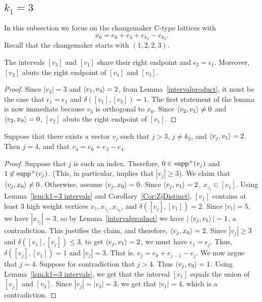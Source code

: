\subsection{{\boldmath $k_1=3$}}\label{k1=3}

In this subsection we focus on the changemaker C-type lattices with 
\begin{equation}\label{x0k1=3}
x_0=e_0+e_3+e_{k_2} - e_{k_3}.
\end{equation}  
Recall that the changemaker starts with $(1,2,2,3)$.

\begin{lemma}\label{lem:k1=3 intervals}
		The intervals $[v_3]$ and $[v_1]$ share their right endpoint and $\epsilon_3 = \epsilon_1$. Moreover, $[v_2]$ abuts the right endpoint of $[v_1]$ and $[v_3]$.
\end{lemma}
\begin{proof}
Since $|v_3|=3$ and $\left\langle v_1 , v_3 \right\rangle=2$, from Lemma~\ref{intervalproduct}, it must be the case that $\epsilon_1=\epsilon_3$ and $\delta([v_1], [v_3])=1$. The first statement of the lemma is now immediate because $v_3$ is orthogonal to $x_0$. Since $\left\langle v_2 , v_1 \right\rangle\ne0$ and $\left\langle v_2 , x_0 \right\rangle=0$, $[v_2]$ abuts the right endpoint of $[v_1]$.
\end{proof}


\begin{cor}\label{cor:k1=3 intervals}
		Suppose that there exists a vector $v_j$ such that $j>3$, $j\neq k_3$, and $\left\langle v_j , v_1 \right\rangle = 2$. Then $j=4$, and that $v_4 = e_0 + e_3-e_4$. 
\end{cor}

\begin{proof}
Suppose that $j$ is such an index. Therefore, $0\in \operatorname{supp}^+(v_j)$ and $1\not \in \operatorname{supp}^+(v_j)$. (This, in particular, implies that $|v_j|\ge3$). We claim that $\left\langle v_j , x_0 \right\rangle\neq 0$. Otherwise, assume $\left\langle v_j , x_0 \right\rangle= 0$. Since $\left\langle v_j , v_1 \right\rangle=2$, $x_{z_j}\in[v_1]$. Using Lemma~\ref{lem:k1=3 intervals} and Corollary~\ref{Cor:ZjDistinct}, $[v_1]$ contains at least $3$ high weight vertices $x_1,x_{z_j},x_{z_3}$, and $\delta([v_j],[v_1])=2$. Since $|v_1|=5$, we have $|x_{z_j}|=3$, so by Lemma~\ref{intervalproduct} we have $|\left\langle v_j , v_1 \right\rangle|=1$, a contradiction.
This justifies the claim, and therefore, $\left\langle v_j , x_0 \right\rangle=2$. Since $|v_j|\ge 3$ and $\delta([v_1], [v_j])\le 3$, to get $\left\langle v_j , v_1 \right\rangle=2$, we must have $\epsilon_1=\epsilon_j$. Thus, $\delta([v_j], [v_1])=1$ and $|v_j|=3$. That is, $v_j=e_0+e_{j-1}-e_{j}$. We now argue that $j=4$. Suppose for contradiction that $j>4$. Thus $\left\langle v_j , v_3 \right\rangle=1$. Using Lemma~\ref{lem:k1=3 intervals}, we get that the interval $[v_1]$ equals the union of $[v_j]$ and $[v_3]$. Since $|v_j|=|v_3|=3$, we get that $|v_1|=4$, which is a contradiction. 
\end{proof}

